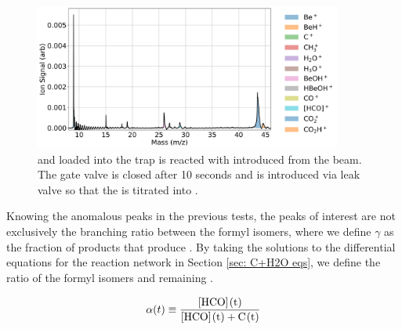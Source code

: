 \begin{figure}[H]
	\centering
	\includegraphics[width=0.9\textwidth]{images/C_H2O_CO2_titration_TOF.png}
	\caption{ and  loaded into the trap is reacted with  introduced from the beam. The gate valve is closed after 10 seconds and  is introduced via leak valve so that the  is titrated into .}
\end{figure}

Knowing the anomalous peaks in the previous tests, the peaks of interest are not exclusively the branching ratio between the formyl isomers, where we define $\gamma$ as the fraction of products that produce . By taking the solutions to the differential equations for the  reaction network in Section \ref{sec: C+H2O eqs}, we define the ratio of the formyl isomers and remaining .

\begin{equation}
	\alpha(t) \equiv \frac{\ce{[HCO](t)}}{\ce{[HCO](t) + C(t)}}
\end{equation}

